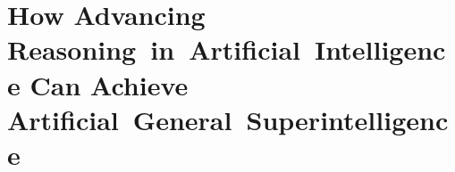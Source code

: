 \chapter{How Advancing Reasoning~in~Artificial~Intelligence Can Achieve Artificial~General~Superintelligence}
